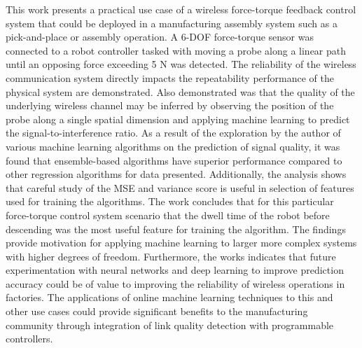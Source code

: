 This work presents a practical use case of a wireless force-torque feedback control system that could be deployed in a manufacturing assembly system such as a pick-and-place or assembly operation.  A 6-DOF force-torque sensor was connected to a robot controller tasked with moving a probe along a linear path until an opposing force exceeding 5 N was detected.  The reliability of the wireless communication system directly impacts the repeatability performance of the physical system are demonstrated.  Also demonstrated was that the quality of the underlying wireless channel may be inferred by observing the position of the probe along a single spatial dimension and applying machine learning to predict the signal-to-interference ratio. As a result of the exploration by the author of various machine learning algorithms on the prediction of signal quality, it was  found that ensemble-based algorithms have superior performance compared to other regression algorithms for data presented.  Additionally, the analysis shows that careful study of the MSE and variance score is useful in selection of features used for training the algorithms. The work concludes that for this particular force-torque control system scenario that the dwell time of the robot before descending was the most useful feature for training the algorithm. The findings provide motivation for applying machine learning to larger more complex systems with higher degrees of freedom. Furthermore, the works indicates that future  experimentation with neural networks and deep learning to improve prediction accuracy could be of value to improving the reliability of wireless operations in factories. The applications of online machine learning techniques to this and other use cases could provide significant benefits to the manufacturing community through integration of link quality detection with programmable controllers.




